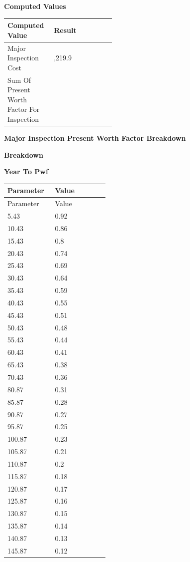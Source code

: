 \documentclass{article}
\begin{document}
\vspace{0.6em}
\vspace{0.4em}
\textbf{Computed Values}\par\vspace{-0.35em}
\begin{tabularx}{\linewidth}{>{\raggedright\arraybackslash}p{0.43\linewidth} >{\raggedright\arraybackslash}X}
\toprule
Computed Value & Result \\
\midrule
Major Inspection Cost & 64,219.9 \\
Sum Of Present Worth Factor For Inspection & 11.17 \\
\bottomrule
\end{tabularx}
\vspace{0.6em}
\vspace{0.4em}
\textbf{Major Inspection Present Worth Factor Breakdown}\par\vspace{-0.35em}
\vspace{0.4em}
\textbf{Breakdown}\par\vspace{-0.35em}
\vspace{0.4em}
\textbf{Year To Pwf}\par\vspace{-0.35em}
\begin{longtable}{p{0.43\linewidth} p{0.49\linewidth}}
\toprule
Parameter & Value \\
\midrule
\endfirsthead
\toprule
Parameter & Value \\
\midrule
\endhead
5.43 & 0.92 \\
10.43 & 0.86 \\
15.43 & 0.8 \\
20.43 & 0.74 \\
25.43 & 0.69 \\
30.43 & 0.64 \\
35.43 & 0.59 \\
40.43 & 0.55 \\
45.43 & 0.51 \\
50.43 & 0.48 \\
55.43 & 0.44 \\
60.43 & 0.41 \\
65.43 & 0.38 \\
70.43 & 0.36 \\
80.87 & 0.31 \\
85.87 & 0.28 \\
90.87 & 0.27 \\
95.87 & 0.25 \\
100.87 & 0.23 \\
105.87 & 0.21 \\
110.87 & 0.2 \\
115.87 & 0.18 \\
120.87 & 0.17 \\
125.87 & 0.16 \\
130.87 & 0.15 \\
135.87 & 0.14 \\
140.87 & 0.13 \\
145.87 & 0.12 \\
\bottomrule
\end{longtable}
\end{document}
